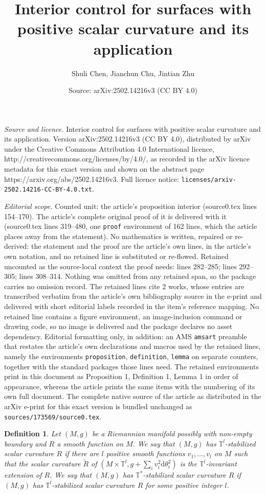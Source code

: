 \documentclass[10pt,a4paper]{amsart}
\title{Interior control for surfaces with positive scalar curvature and its application}
\author{Shuli Chen, Jianchun Chu, Jintian Zhu}
\date{Source: arXiv:2502.14216v3 (CC BY 4.0)}
\newtheorem{definition}{Definition}
\begin{document}
\maketitle

\noindent\emph{Source and licence.} Interior control for surfaces with positive scalar curvature and its application. Version arXiv:2502.14216v3 (CC BY 4.0), distributed by arXiv under the Creative Commons Attribution 4.0 International licence, http://creativecommons.org/licenses/by/4.0/, as recorded in the arXiv licence metadata for this exact version and shown on the abstract page https://arxiv.org/abs/2502.14216v3. Full licence notice: \texttt{licenses/arxiv-2502.14216-CC-BY-4.0.txt}.\par\smallskip

\noindent\textit{Editorial scope.} Counted unit: the article's proposition interior (source0.tex lines 154--170). The article's complete original proof of it is delivered with it (source0.tex lines 319--480, one \texttt{proof} environment of 162 lines, which the article places away from the statement). No mathematics is written, repaired or re-derived: the statement and the proof are the article's own lines, in the article's own notation, and no retained line is substituted or re-flowed.  Retained uncounted as the source-local context the proof needs: lines 282--285; lines 292--305; lines 308--314.  Nothing was omitted from any retained span, so the package carries no omission record.  The retained lines cite 2 works, whose entries are transcribed verbatim from the article's own bibliography source in the e-print and delivered with short editorial labels recorded in the item's reference mapping.  No retained line contains a figure environment, an image-inclusion command or drawing code, so no image is delivered and the package declares no asset dependency.  Editorial formatting only, in addition: an AMS \texttt{amsart} preamble that restates the article's own declarations and macros used by the retained lines, namely the environments \texttt{proposition}, \texttt{definition}, \texttt{lemma} on separate counters, together with the standard packages those lines need.  The retained environments print in this document as Proposition 1, Definition 1, Lemma 1 in order of appearance, whereas the article prints the same items with the numbering of its own full document.  The complete native source of the article as distributed in the arXiv e-print for this exact version is bundled unchanged as \texttt{sources/173569/source0.tex}.
\begin{definition}\label{Defn: stabilized scalar curvature}
Let $(M,g)$ be a Riemannian manifold possibly with non-empty boundary and $R$ a smooth function on $M$. We say that $(M,g)$ has $\mathbb T^l$-stabilized scalar curvature $R$ if there are $l$ positive smooth functions $v_1,\ldots,v_l$ on $M$ such that the scalar curvature $\tilde R$ of $(M\times \mathbb T^l,g+\sum_i v_i^2\mathrm d\theta_i^2)$ is the $\mathbb T^l$-invariant extension of $R$.
We say that $(M,g)$ has $\mathbb T^*$-stabilized scalar curvature $R$ if $(M,g)$ has $\mathbb T^l$-stabilized scalar curvature $R$ for some positive integer $l$.
\end{definition}
\end{document}
